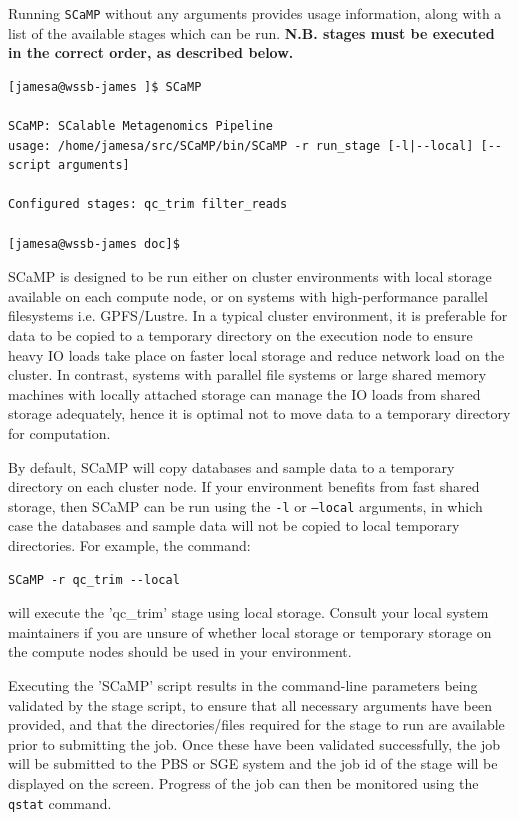 \documentclass[a4paper,10pt]{article}
\begin{document}
Running {\tt SCaMP} without any arguments provides usage information, along
with a list of the available stages which can be run. \textbf{N.B. stages must
be executed in the correct order, as described below.}

\begin{verbatim}
[jamesa@wssb-james ]$ SCaMP 

SCaMP: SCalable Metagenomics Pipeline
usage: /home/jamesa/src/SCaMP/bin/SCaMP -r run_stage [-l|--local] [-- script arguments]

Configured stages: qc_trim filter_reads

[jamesa@wssb-james doc]$ 
\end{verbatim}

SCaMP is designed to be run either on cluster environments with local storage
available on each compute node, or on systems with high-performance parallel
filesystems i.e. GPFS/Lustre. In a typical cluster environment, it is
preferable for data to be copied to a temporary directory on the execution node
to ensure heavy IO loads take place on faster local storage and reduce network
load on the cluster. In contrast, systems with parallel file systems or large
shared memory machines with locally attached storage can manage the IO loads
from shared storage adequately, hence it is optimal not to move data to a
temporary directory for computation.

By default, SCaMP will copy databases and sample data to a temporary directory
on each cluster node. If your environment benefits from fast shared storage,
then SCaMP can be run using the {\tt -l} or {\tt --local} arguments, in which
case the databases and sample data will not be copied to local temporary
directories. For example, the command:

\begin{verbatim}
SCaMP -r qc_trim --local
\end{verbatim}

will execute the 'qc\_trim' stage using local storage. Consult your local
system maintainers if you are unsure of whether local storage or temporary
storage on the compute nodes should be used in your environment. 

Executing the 'SCaMP' script results in the command-line parameters being
validated by the stage script, to ensure that all necessary arguments have been
provided, and that the directories/files required for the stage to run are
available prior to submitting the job. Once these have been validated
successfully, the  job will be submitted to the PBS or SGE system and the job
id of the stage will be displayed on the screen. Progress of the job can then
be monitored using the {\tt qstat} command. 
\end{document}

